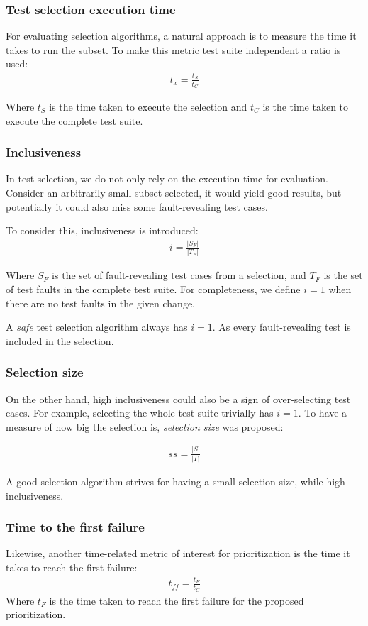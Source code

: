\subsubsection{Test selection execution time}
For evaluating selection algorithms, a natural approach is to measure the time it takes to run the subset. To make 
this metric test suite independent a ratio is used:
\begin{align*}
    t_x = \frac{t_S}{t_C}
\end{align*}

Where $t_S$ is the time taken to execute the selection and $t_C$ is the time taken to execute the complete test suite.

\subsubsection{Inclusiveness}
In test selection, we do not only rely on the execution time for evaluation. Consider an arbitrarily small subset selected, it would yield good results,
but potentially it could also miss some fault-revealing test cases.

To consider this, inclusiveness is introduced:
\begin{align*}
i = \frac{|S_F|}{|T_F|}
\end{align*}

Where $S_F$ is the set of fault-revealing test cases from a selection, and $T_F$ is the set of test faults in the complete
test suite. For completeness, we define $i=1$ when there are no test faults in the given change.

A \emph{safe} test selection algorithm \cite{366926} always has $i = 1$. As every fault-revealing test is included in the selection.

\subsubsection{Selection size}
On the other hand, high inclusiveness could also be a sign of over-selecting test cases. For example, selecting the whole test
suite trivially has $i=1$. To have a measure of how big the selection is, \emph{selection size} was proposed:

\begin{align*}
    ss = \frac{|S|}{|T|}
\end{align*}

A good selection algorithm strives for having a small selection size, while high inclusiveness.

\subsubsection{Time to the first failure}
Likewise, another time-related metric of interest for prioritization is the time it takes to reach the first failure:
\begin{align*}
    t_{ff} = \frac{t_F}{t_C}
\end{align*}
Where $t_F$ is the time taken to reach the first failure for the proposed prioritization.

